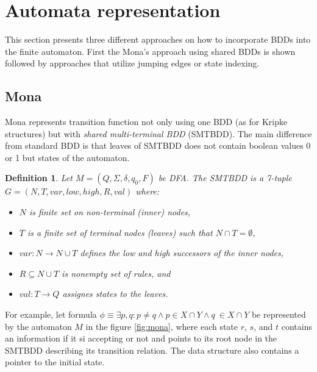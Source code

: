 \documentclass[pdflatex,sn-mathphys-num]{sn-jnl}%
\theoremstyle{thmstyleone}%
\theoremstyle{thmstyletwo}%
\theoremstyle{thmstylethree}%
\newtheorem{definition}{Definition}%
\begin{document}
\section{Automata representation}
    This section presents three different approaches on how to incorporate BDDs into the finite automaton. First the Mona's approach using shared BDDs is shown followed by approaches that utilize jumping edges or state indexing.

    \subsection{Mona}
        Mona represents transition function not only using one BDD (as for Kripke structures) but with \textit{shared multi-terminal BDD} (SMTBDD). The main difference from standard BDD is that leaves of SMTBDD does not contain boolean values 0 or 1 but states of the automaton.

        \vspace*{0.5em}

        \begin{definition}
            Let $M = (Q, \Sigma, \delta, q_0, F)$ be DFA. The SMTBDD is a 7-tuple $G = (N, T, var, low, high, R, val)$ where:
            \begin{itemize}[noindent]
                \item $N$ is finite set on non-terminal (inner) nodes,
                \item $T$ is a finite set of terminal nodes (leaves) such that $N \cap T = \emptyset$,
                \item $var : N \rightarrow N \cup T$ defines the low and high successors of the inner nodes,
                \item $R \subseteq N \cup T$ is nonempty set of rules, and
                \item $val : T \rightarrow Q$ assignes states to the leaves.
            \end{itemize}
        \end{definition}

        For example, let formula $\phi \equiv \exists p, q : p \neq q \land p \in X \cap Y \land q \ \in X \cap Y$ be represented by the automaton $M$ in the figure \ref{fig:mona}, where each state $r$, $s$, and $t$ contains an information if it si accepting or not and points to its root node in the SMTBDD describing its transition relation. The data structure also contains a pointer to the initial state.
\end{document}
